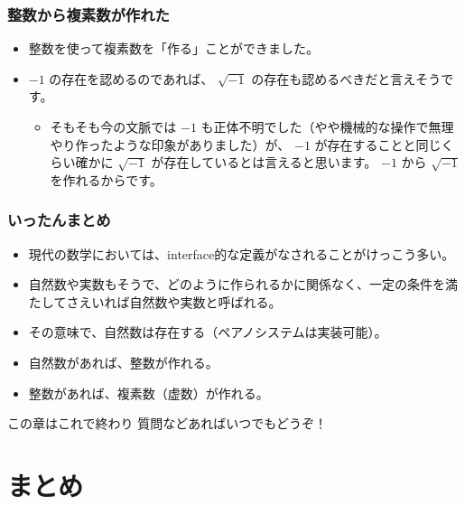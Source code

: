 \documentclass[dvipdfmx]{beamer}
\begin{document}
  \begin{frame}
    \frametitle{整数から複素数が作れた}

    \begin{itemize}
      \item 整数を使って複素数を「作る」ことができました。
      \item $-1$ の存在を認めるのであれば、 $\sqrt{-1}$ の存在も認めるべきだと言えそうです。
      \begin{itemize}
        \item そもそも今の文脈では $-1$ も正体不明でした（やや機械的な操作で無理やり作ったような印象がありました）が、 $-1$ が存在することと同じくらい確かに $\sqrt{-1}$ が存在しているとは言えると思います。 $-1$ から $\sqrt{-1}$ を作れるからです。
      \end{itemize}
    \end{itemize}

  \end{frame}

  \begin{frame}
    \frametitle{いったんまとめ}

    \begin{itemize}
      \item 現代の数学においては、interface的な定義がなされることがけっこう多い。
      \item 自然数や実数もそうで、どのように作られるかに関係なく、一定の条件を満たしてさえいれば自然数や実数と呼ばれる。
      \item その意味で、自然数は存在する（ペアノシステムは実装可能）。
      \item 自然数があれば、整数が作れる。
      \item 整数があれば、複素数（虚数）が作れる。
    \end{itemize}

    \begin{block}{この章はこれで終わり}
      質問などあればいつでもどうぞ！
    \end{block}

  \end{frame}

  \section{まとめ}
\end{document}
